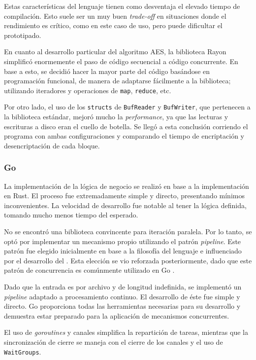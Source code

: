 \documentclass[11pt]{article}
\let\Oldsubsubsection\subsubsection
\renewcommand{\subsubsection}{\FloatBarrier\Oldsubsubsection}
\newcommand{\english}[1]{\textit{#1}}
\begin{document}
Estas características del lenguaje tienen como desventaja el elevado tiempo de compilación. Esto suele ser un muy buen \english{trade-off} en situaciones donde el rendimiento es crítico, como en este caso de uso, pero puede dificultar el prototipado.

En cuanto al desarrollo particular del algoritmo AES, la biblioteca Rayon simplificó enormemente el paso de código secuencial a código concurrente. En base a esto, se decidió hacer la mayor parte del código basándose en programación funcional, de manera de adaptarse fácilmente a la biblioteca; utilizando iteradores y operaciones de \lstinline{map}, \lstinline{reduce}, etc.

Por otro lado, el uso de los \lstinline{structs} de \lstinline{BufReader} y \lstinline{BufWriter}, que pertenecen a la biblioteca estándar, mejoró mucho la \english{performance}, ya que las lecturas y escrituras a disco eran el cuello de botella. Se llegó a esta conclusión corriendo el programa con ambas configuraciones y comparando el tiempo de encriptación y desencriptación de cada bloque.

\subsubsection{Go}


La implementación de la lógica de negocio se realizó en base a la implementación en Rust. El proceso fue extremadamente simple y directo, presentando mínimos inconvenientes. La velocidad de desarrollo fue notable al tener la lógica definida, tomando mucho menos tiempo del esperado.

No se encontró una biblioteca convincente para iteración paralela. Por lo tanto, se optó por implementar un mecanismo propio utilizando el patrón \textit{pipeline}. Este patrón fue elegido inicialmente en base a la filosofía del lenguaje \cite{go:ex:sharing} e influenciado por el desarrollo del . Esta elección se vio reforzada posteriormente, dado que este patrón de concurrencia es comúnmente utilizado en Go \cite{go:ex:pipelines}.

Dado que la entrada es por archivo y de longitud indefinida, se implementó un \textit{pipeline} adaptado a procesamiento continuo. El desarrollo de éste fue simple y directo. Go proporciona todas las herramientas necesarias para su desarrollo y demuestra estar preparado para la aplicación de mecanismos concurrentes.

El uso de \textit{goroutines} y canales simplifica la repartición de tareas, mientras que la sincronización de cierre se maneja con el cierre de los canales y el uso de \lstinline{WaitGroups}.
\end{document}

